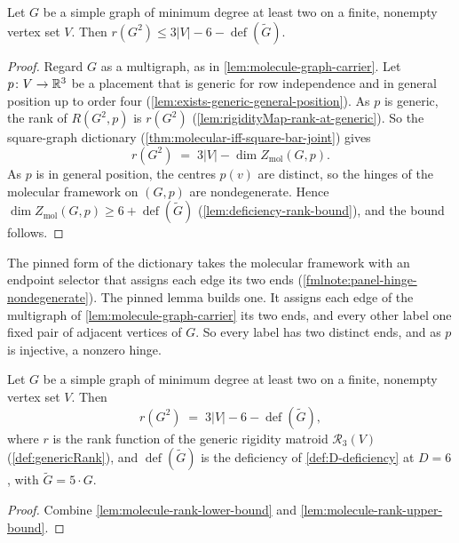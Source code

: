 \begin{lemma}
  \label{lem:molecule-rank-upper-bound}
  \leanok
  Let $G$ be a simple graph of minimum degree at least two on a finite,
  nonempty vertex set $V$. Then
  $r(G^2) \le 3|V| - 6 - \operatorname{def}(\tilde G)$.
\end{lemma}
\begin{proof}
  \leanok
  Regard $G$ as a multigraph, as in \cref{lem:molecule-graph-carrier}.
  Let $p \colon V \to {\mathbb{R}}^3$ be a placement that is generic for row
  independence and in general position up to order four
  (\cref{lem:exists-generic-general-position}). As $p$ is generic, the
  rank of $R(G^2, p)$ is $r(G^2)$
  (\cref{lem:rigidityMap-rank-at-generic}). So the square-graph
  dictionary (\cref{thm:molecular-iff-square-bar-joint}) gives
  \[
    r(G^2) \;=\; 3|V| - \dim Z_{\mathrm{mol}}(G, p).
  \]
  As $p$ is in general position, the centres $p(v)$ are distinct, so the
  hinges of the molecular framework on $(G, p)$ are nondegenerate. Hence
  $\dim Z_{\mathrm{mol}}(G, p) \ge 6 + \operatorname{def}(\tilde G)$
  (\cref{lem:deficiency-rank-bound}), and the bound follows.
\end{proof}

\begin{fmlnote}
  The pinned form of the dictionary takes the molecular framework with an
  endpoint selector that assigns each edge its two ends
  (\cref{fmlnote:panel-hinge-nondegenerate}). The pinned lemma builds
  one. It assigns each edge of the multigraph of
  \cref{lem:molecule-graph-carrier} its two ends, and every other label
  one fixed pair of adjacent vertices of $G$. So every label has two
  distinct ends, and as $p$ is injective, a nonzero hinge.
\end{fmlnote}

\begin{corollary}
  \label{cor:molecule-rank-formula}
  \leanok
  Let $G$ be a simple graph of minimum degree at least two on a finite,
  nonempty vertex set $V$. Then
  \[
    r(G^2) \;=\; 3|V| - 6 - \operatorname{def}(\tilde G),
  \]
  where $r$ is the rank function of the generic rigidity matroid
  $\mathcal{R}_3(V)$ (\cref{def:genericRank}), and
  $\operatorname{def}(\tilde G)$ is the deficiency of
  \cref{def:D-deficiency} at $D = 6$, with $\tilde G = 5 \cdot G$.
\end{corollary}
\begin{proof}
  \leanok
  Combine \cref{lem:molecule-rank-lower-bound} and
  \cref{lem:molecule-rank-upper-bound}.
\end{proof}

